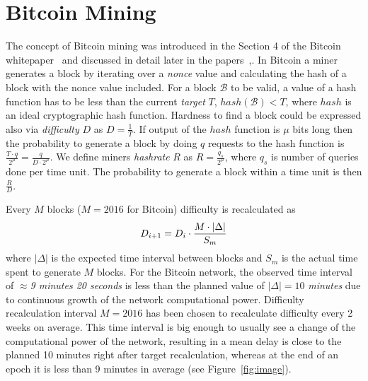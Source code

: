 \documentclass[]{llncs}
\newcommand{\texp}{|\Delta|}
\newcommand{\block}{\mathcal{B}}
\begin{document}
\section{Bitcoin Mining}
\label{sec:bit}

The concept of Bitcoin mining was introduced in the Section 4 of the Bitcoin whitepaper~\cite{Nakamoto2008} and discussed in detail later in the papers~\cite{kraft2015difficulty},\cite{gkl16}. In Bitcoin a miner generates a block by iterating over a {\em nonce} value and calculating the hash of a block with the nonce value included. For a block $\block$ to be valid, a value of a hash function has to be less than the current {\em target} $T$, $hash(\block) < T$, where $hash$ is an ideal cryptographic hash function. Hardness to find a block could be expressed also via {\em difficulty} $D$ as $D = \frac{1}{T}$. If output of the $hash$ function is $\mu$ bits long then the probability to generate a block by doing $q$ requests to the hash function is $\frac{T \cdot q}{2^\mu} = \frac{q}{D \cdot 2^\mu}$. We define miners \textit{hashrate} $R$ as $R = \frac{q_s}{2^\mu}$, where $q_s$ is number of queries done per time unit. The probability to generate a block within a time unit is then $\frac{R}{D}$.


Every $M$ blocks ($M = 2016$ for Bitcoin) difficulty is recalculated as
\begin{equation}
D_{i+1}=D_i \cdot {M \cdot \texp \over S_m}
\end{equation}
where $\texp$ is the expected time interval between blocks and $S_m$ is the actual time spent to generate $M$ blocks.
For the Bitcoin network, the observed time interval of $\approx${\em 9 minutes 20 seconds} is less than the planned value of $\texp = 10$ {\em minutes} due to continuous growth of the network computational power.
Difficulty recalculation interval $M=2016$ has been chosen to recalculate difficulty every 2 weeks on average.
This time interval is big enough to usually see a change of the computational power of the network, resulting in a mean delay is close to the planned 10 minutes right after target recalculation, whereas at the end of an epoch it is less than 9 minutes in average (see Figure~\ref{fig:image}).
\end{document}
